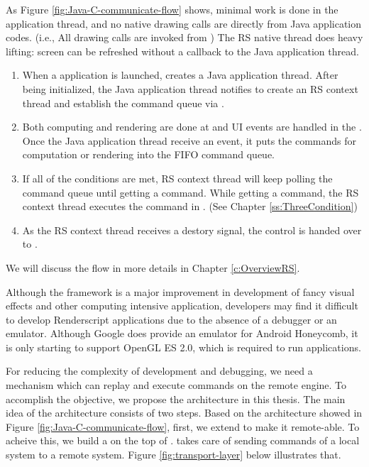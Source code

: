 As Figure \ref{fig:Java-C-communicate-flow} shows, minimal work is done in the application thread, and no native drawing calls are directly from Java application codes. (i.e., All drawing calls are invoked from \Core{}) The RS native thread does heavy lifting: screen can be refreshed without a callback to the Java application thread.

\begin{enumerate}[label=Step \arabic*., font=\sffamily\bfseries]
\item When a \RS{} application is launched, \Client{} creates a Java application thread. After being initialized, the Java application thread notifies \Core{} to create an RS context thread and establish the command queue via \Bridge{}. 
\item Both computing and rendering are done at \Core{} and UI events are handled in the \Client{}. Once the Java application thread receive an event, it puts the commands for computation or rendering into the FIFO command queue.
\item If all of the conditions are met, RS context thread will keep polling the command queue until getting a command. While getting a command, the RS context thread executes the command in \Core{}. (See Chapter \ref{ss:ThreeCondition})
\item As the RS context thread receives a destory signal, the control is handed over to \Client{}.
\end{enumerate}
We will discuss the flow in more details in Chapter \ref{c:OverviewRS}.

Although the \RS{} framework is a major improvement in development of fancy visual effects and other computing intensive application, developers may find it difficult to develop Renderscript applications due to the absence of a debugger or an emulator. Although Google does provide an emulator for Android Honeycomb, it is only starting to support OpenGL ES 2.0, which is required to run \RS{} applications. 

For reducing the complexity of development and debugging, we need a mechanism which can replay and execute \RS{} commands on the remote engine. To accomplish the objective, we propose the \RRS{} architecture in this thesis. The main idea of the \RRS{} architecture consists of two steps. Based on the architecture showed in Figure \ref{fig:Java-C-communicate-flow}, first, we extend \RS{} to make it remote-able. To acheive this, we build a \Transport{} on the top of \Core{}. \Transport{} takes care of sending commands of a local \RS{} system to a remote \RS{} system. Figure \ref{fig:transport-layer} below illustrates that.


